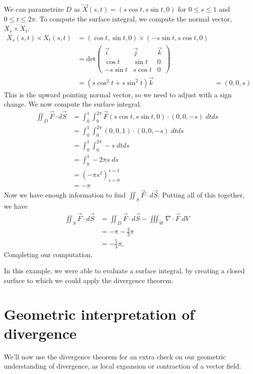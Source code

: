 \documentclass{ximera}
\begin{document}
\begin{example}
We can parametrize $D$ as $\vec{X}(s,t) = (s\cos t, s\sin t, 0)$ for $0\leq s\leq 1$ and $0\leq t\leq 2\pi$. To compute the surface integral, we compute the normal vector, $X_s\times X_t$.
\begin{align*}
X_s(s,t) \times X_t(s,t) &= (\cos t, \sin t, 0)\times (-s\sin t, s\cos t, 0)\\
&= \text{det}\begin{pmatrix}
\vec{i} & \vec{j} & \vec{k}\\
\cos t & \sin t & 0\\
-s\sin t & s\cos t & 0
\end{pmatrix}\\
&= (s\cos^2 t + s\sin^2 t)\vec{k}
&= (0,0,s)
\end{align*}
This is the upward pointing normal vector, so we need to adjust with a sign change. We now compute the surface integral.
\begin{align*}
\iint_D \vec{F}\cdot d\vec{S} &= \int_0^1\int_0^{2\pi}\vec{F}(s\cos t, s\sin t, 0)\cdot (0,0,-s)\;dtds\\
&= \int_0^1\int_0^{2\pi} (0,0,1)\cdot (0,0,-s)\;dtds\\
&= \int_0^1\int_0^{2\pi} -s\;dtds\\
&= \int_0^1 -2\pi s\;ds\\
&= \left(-\pi s^2\right)_{s=0}^{s=1}\\
&= -\pi
\end{align*}
Now we have enough information to find $\iint_S\vec{F}\cdot d\vec{S}$. Putting all of this together, we have
\begin{align*}
\iint_S\vec{F}\cdot d\vec{S} &= \iint_D\vec{F}\cdot d\vec{S} - \iiint_W \nabla\cdot \vec{F}\;dV\\
 &= -\pi -\frac{2}{3}\pi\\
 &= -\frac{5}{3}\pi,
\end{align*}
Completing our computation.

In this example, we were able to evaluate a surface integral, by creating a closed surface to which we could apply the divergence theorem.
\end{example}

\section*{Geometric interpretation of divergence}

We'll now use the divergence theorem for an extra check on our geometric understanding of divergence, as local expansion or contraction of a vector field.
\end{document}
